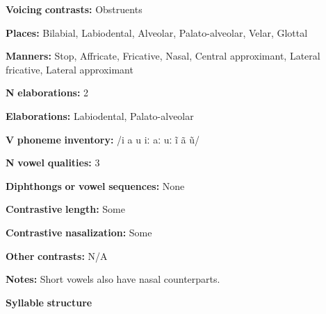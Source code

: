 \documentclass[output=paper]{langsci/langscibook}
\begin{document}
\begin{styleBody}
\textbf{Voicing} \textbf{contrasts:} Obstruents
\end{styleBody}

\begin{styleBody}
\textbf{Places:} Bilabial, Labiodental, Alveolar, Palato-alveolar, Velar, Glottal
\end{styleBody}

\begin{styleBody}
\textbf{Manners:} Stop, Affricate, Fricative, Nasal, Central approximant, Lateral fricative, Lateral approximant
\end{styleBody}

\begin{styleBody}
\textbf{N} \textbf{elaborations:} 2
\end{styleBody}

\begin{styleBody}
\textbf{Elaborations:} Labiodental, Palato-alveolar
\end{styleBody}

\begin{styleBody}
\textbf{V} \textbf{phoneme} \textbf{inventory:} /i a u iː aː uː ĩ ã ũ/
\end{styleBody}

\begin{styleBody}
\textbf{N} \textbf{vowel} \textbf{qualities:} 3
\end{styleBody}

\begin{styleBody}
\textbf{Diphthongs} \textbf{or} \textbf{vowel} \textbf{sequences:} None
\end{styleBody}

\begin{styleBody}
\textbf{Contrastive} \textbf{length:} Some
\end{styleBody}

\begin{styleBody}
\textbf{Contrastive} \textbf{nasalization:} Some
\end{styleBody}

\begin{styleBody}
\textbf{Other} \textbf{contrasts:} N/A
\end{styleBody}

\begin{styleBody}
\textbf{Notes:} Short vowels also have nasal counterparts.
\end{styleBody}

\begin{styleBody}
\textbf{Syllable} \textbf{structure}
\end{styleBody}
\end{document}
